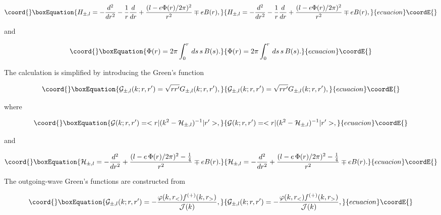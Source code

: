 \documentclass[a4paper,twocolumn,showpacs,preprintnumbers,amsmath,amssymb]{revtex4}
\providecommand{\odo}[1]{\ensuremath{\frac{d}{d #1}}}
\providecommand{\odho}[2]{\ensuremath{\frac{d^{#1}}{d #2^{#1} }}}
\begin{document}
\begin{equation}\coord{}\boxEquation{
\label{Eq_0204}
H_{\pm, l} = - \odho{2}{r} - \frac{1}{r} \odo{r}
	+ \frac{(l - e\Phi(r) / 2\pi)^2}{r^2} \mp e B(r),
}{
H_{\pm, l} = - \odho{2}{r} - \frac{1}{r} \odo{r}
	+ \frac{(l - e\Phi(r) / 2\pi)^2}{r^2} \mp e B(r),
}{ecuacion}\coordE{}\end{equation} 

and

\begin{equation}\coord{}\boxEquation{
\label{Eq_0205}
\Phi(r) = 2 \pi \int^{r}_{0} \, ds \, s \, B(s). 
}{
\Phi(r) = 2 \pi \int^{r}_{0} \, ds \, s \, B(s). 
}{ecuacion}\coordE{}\end{equation}

The calculation is simplified by introducing the Green's function

\begin{equation}\coord{}\boxEquation{
\label{Eq_0206}
\mathcal{G}_{\pm,l}(k;r,r') = \sqrt{rr'} G_{\pm,l}(k;r,r'),
}{
\mathcal{G}_{\pm,l}(k;r,r') = \sqrt{rr'} G_{\pm,l}(k;r,r'),
}{ecuacion}\coordE{}\end{equation}

\noindent
where

\begin{equation}\coord{}\boxEquation{
\label{Eq_0207}
\mathcal{G}(k;r,r') = <r|(k^2 - \mathcal{H}_{\pm,l})^{-1}|r'>,
}{
\mathcal{G}(k;r,r') = <r|(k^2 - \mathcal{H}_{\pm,l})^{-1}|r'>,
}{ecuacion}\coordE{}\end{equation}

\noindent
and

\begin{equation}\coord{}\boxEquation{
\label{Eq_0208}
\mathcal{H}_{\pm,l} = - \odho{2}{r}
	+ \frac{(l - e \, \Phi(r) / 2\pi)^2 - \frac{1}{4}}{r^2} \mp e B(r).
}{
\mathcal{H}_{\pm,l} = - \odho{2}{r}
	+ \frac{(l - e \, \Phi(r) / 2\pi)^2 - \frac{1}{4}}{r^2} \mp e B(r).
}{ecuacion}\coordE{}\end{equation}

The outgoing-wave Green's functions \coordHE{} are
constructed from ~\cite{Newton82}

\begin{equation}\coord{}\boxEquation{
\label{Eq_0209}
\mathcal{G}_{\pm,l}(k;r,r')
	= - \frac{\varphi(k, r_{<}) f^{(+)}(k, r_{>})}{\mathcal{J}(k)},
}{
\mathcal{G}_{\pm,l}(k;r,r')
	= - \frac{\varphi(k, r_{<}) f^{(+)}(k, r_{>})}{\mathcal{J}(k)},
}{ecuacion}\coordE{}\end{equation}
\end{document}
